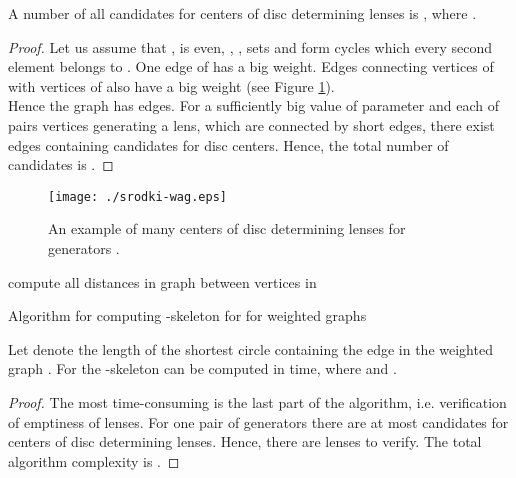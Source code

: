 \documentclass[11pt]{llncs}
\begin{document}
\begin{lemma}
A number of all candidates for centers of disc determining lenses is , where .
\end{lemma}
\begin{proof}
Let us assume that ,  is even, , , sets  and  
form cycles which every second element belongs to . One edge of  has a big weight.
Edges connecting vertices of  with vertices of  also have
a big weight (see Figure \ref{fig:sr-wag}). \\
Hence the graph  has  edges.
For a sufficiently big value of parameter  and each of  pairs vertices generating 
a lens, which are connected by  short edges, there exist  edges containing 
candidates for disc centers. Hence, the total number of candidates is 
.
\end{proof} 


\begin{figure}[htbp]
\centering
\texttt{[image: ./srodki-wag.eps]}
\caption{ An example of many centers of disc determining lenses for generators .}
\label{fig:sr-wag}
\end{figure}   


\begin{algorithm}[H]
\footnotesize{
\BlankLine
compute all distances in graph  between vertices in \;
}
\caption{Algorithm for computing -skeleton for  for weighted graphs }  
\end{algorithm}  

\begin{theorem}
Let  denote the length of the shortest circle containing the edge  
in the weighted graph .
For 
the -skeleton  can be computed in  time, where  and .
\end{theorem}
\begin{proof}
The most time-consuming is the last part of the algorithm, i.e. verification of emptiness of lenses.
For one pair of generators there are at most  candidates for centers of disc determining lenses.
Hence, there are  lenses to verify. The total algorithm complexity
is .
\end{proof}
\end{document}
